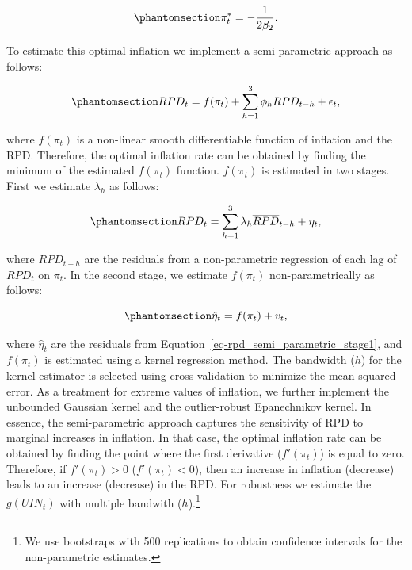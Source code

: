 \documentclass[
  letterpaper,
  DIV=11,
  numbers=noendperiod]{scrartcl}
\begin{document}
\begin{equation}\phantomsection\label{eq-optimal_inflation}{\pi_t^* = -\dfrac{1}{2\beta_2}.}\end{equation}

To estimate this optimal inflation we implement a semi parametric
approach as follows:

\begin{equation}\phantomsection\label{eq-rpd_semi_parametric_f}{RPD_t =  f(\pi_t) + \sum_{h=1}^{3}\phi_hRPD_{t-h} + \epsilon_t, }\end{equation}

where \(f(\pi_t)\) is a non-linear smooth differentiable function of
inflation and the RPD. Therefore, the optimal inflation rate can be
obtained by finding the minimum of the estimated \(f(\pi_t)\) function.
\(f(\pi_t)\) is estimated in two stages. First we estimate \(\lambda_h\)
as follows:

\begin{equation}\phantomsection\label{eq-rpd_semi_parametric_stage1}{ RPD_t = \sum_{h=1}^{3}\lambda_h\overline{RPD}_{t-h} + \eta_t, }\end{equation}

where \(\overline{RPD}_{t-h}\) are the residuals from a non-parametric
regression of each lag of \(RPD_t\) on \(\pi_t\). In the second stage,
we estimate \(f(\pi_t)\) non-parametrically as follows:

\begin{equation}\phantomsection\label{eq-rpd_semi_parametric_stage2}{\hat{\eta}_t = f(\pi_t) + v_t, }\end{equation}

where \(\hat{\eta}_t\) are the residuals from
Equation~\ref{eq-rpd_semi_parametric_stage1}, and \(f(\pi_t)\) is
estimated using a kernel regression method. The bandwidth (\(h\)) for
the kernel estimator is selected using cross-validation to minimize the
mean squared error. As a treatment for extreme values of inflation, we
further implement the unbounded Gaussian kernel and the outlier-robust
Epanechnikov kernel. In essence, the semi-parametric approach captures
the sensitivity of RPD to marginal increases in inflation. In that case,
the optimal inflation rate can be obtained by finding the point where
the first derivative (\(f'(\pi_t)\)) is equal to zero. Therefore, if
\(f'(\pi_t) > 0\) (\(f'(\pi_t) < 0\)), then an increase in inflation
(decrease) leads to an increase (decrease) in the RPD. For robustness we
estimate the \(g(UIN_t)\) with multiple bandwith (\(h\)).\footnote{We
  use bootstraps with 500 replications to obtain confidence intervals
  for the non-parametric estimates.}
\end{document}
